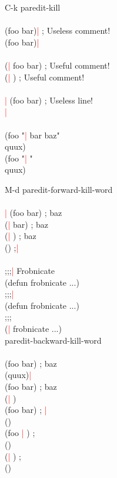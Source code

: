 \documentclass[8pt,a4paper,landscape]{extarticle}
\newcommand{\csr}{\textcolor{red}{| }}
\begin{document}
\begin{multicols}{4}
\begin{eqlist}
\item[C-k] paredit-kill\\
  \\
  (foo bar)\csr      ; Useless comment!\\
  (foo bar)\csr \\
  \\
  (\csr foo bar)     ; Useful comment!\\
  (\csr )     ; Useful comment!\\
  \\
  \csr (foo bar)     ; Useless line!\\
  \csr \\
  \\
  (foo "\csr bar baz"\\
  quux)\\
  (foo "\csr "\\
  quux)\\
\columnbreak

\item[M-d] paredit-forward-kill-word\\
  \\
  \csr (foo bar)    ; baz\\
  (\csr  bar)    ; baz\\
  (\csr )    ; baz\\
  ()    ;\csr \\
  \\
  ;;;\csr  Frobnicate\\
  (defun frobnicate ...)\\
  ;;;\csr \\
  (defun frobnicate ...)\\
  ;;;\\
  (\csr  frobnicate ...)\\


\longitem[M-DEL] paredit-backward-kill-word\\
  \\
  (foo bar)    ; baz\\
  (quux)\csr \\
  (foo bar)    ; baz\\
  (\csr )\\
  (foo bar)    ; \csr \\
  ()\\
  (foo \csr )    ; \\
  ()\\
  (\csr )    ; \\
  ()\\
\end{eqlist}


\end{multicols}
\end{document}
